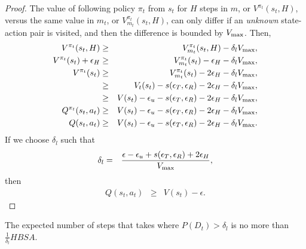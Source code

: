 \begin{proof}
The value of following policy $\pi_t$ from $s_t$ for $H$ steps in $m$, or $V^{\pi_t}(s_t,H)$, versus the same value in $m_t$, or $V^{\pi_t}_{m_t}(s_t,H)$, can only differ if an \emph{unknown} state-action pair is visited, and then the difference is bounded by $V_{\rm max}$. Then,
\begin{eqnarray}
V^{\pi_t}(s_t,H) &\geq& V^{\pi_t}_{m_t}(s_t,H) - \delta_lV_{\rm max},\\
V^{\pi_t}(s_t) + \epsilon_H  &\geq& V^{\pi_t}_{m_t}(s_t) - \epsilon_H - \delta_lV_{\rm max},\\
V^{\pi_t}(s_t) &\geq& V^{\pi_t}_{m_t}(s_t) - 2\epsilon_H - \delta_lV_{\rm max},\\
 &\geq& V_t(s_t) - s(\epsilon_T,\epsilon_R) -2 \epsilon_H - \delta_lV_{\rm max},\\
 &\geq& V(s_t) - \epsilon_u - s(\epsilon_T,\epsilon_R) -2 \epsilon_H - \delta_lV_{\rm max},\\
Q^{\pi_t}(s_t,a_t) &\geq& V(s_t) - \epsilon_u - s(\epsilon_T,\epsilon_R) -2 \epsilon_H - \delta_lV_{\rm max},\\
Q(s_t,a_t) &\geq& V(s_t) - \epsilon_u - s(\epsilon_T,\epsilon_R) -2 \epsilon_H - \delta_lV_{\rm max}.
\end{eqnarray}
If we choose $\delta_l$ such that
\begin{eqnarray}
\delta_l &=& \frac {\epsilon - \epsilon_u + s(\epsilon_T,\epsilon_R) +2 \epsilon_H} {V_{\rm max}},
\end{eqnarray}
then 
\begin{eqnarray}
Q(s_t,a_t) &\geq& V(s_t) - \epsilon.
\end{eqnarray}

\end{proof}

\begin{lemma}
The expected number of steps that \A takes where $P(D_t) > \delta_l$ is no more than $\frac 1 {\delta_l} H B S A $.
\end{lemma}

